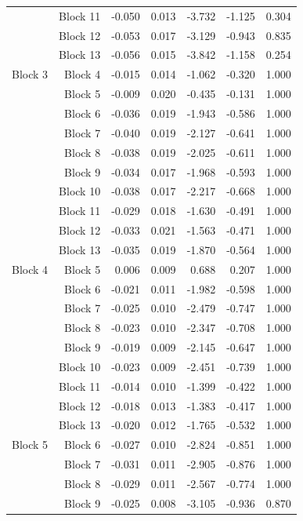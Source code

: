 \begin{longtable}{lrrrrrr}
		 & Block 11 & -0.050 & 0.013 & -3.732 & -1.125 & 0.304  \\
		 & Block 12 & -0.053 & 0.017 & -3.129 & -0.943 & 0.835  \\
		 & Block 13 & -0.056 & 0.015 & -3.842 & -1.158 & 0.254  \\
		Block 3 & Block 4 & -0.015 & 0.014 & -1.062 & -0.320 & 1.000  \\
		  & Block 5 & -0.009 & 0.020 & -0.435 & -0.131 & 1.000  \\
		 & Block 6 & -0.036 & 0.019 & -1.943 & -0.586 & 1.000  \\
		 & Block 7 & -0.040 & 0.019 & -2.127 & -0.641 & 1.000  \\
		 & Block 8 & -0.038 & 0.019 & -2.025 & -0.611 & 1.000  \\
		 & Block 9 & -0.034 & 0.017 & -1.968 & -0.593 & 1.000  \\
		 & Block 10 & -0.038 & 0.017 & -2.217 & -0.668 & 1.000  \\
		 & Block 11 & -0.029 & 0.018 & -1.630 & -0.491 & 1.000  \\
		 & Block 12 & -0.033 & 0.021 & -1.563 & -0.471 & 1.000  \\
		 & Block 13 & -0.035 & 0.019 & -1.870 & -0.564 & 1.000  \\
		Block 4 & Block 5 & 0.006 & 0.009 & 0.688 & 0.207 & 1.000  \\
		  & Block 6 & -0.021 & 0.011 & -1.982 & -0.598 & 1.000  \\
		 & Block 7 & -0.025 & 0.010 & -2.479 & -0.747 & 1.000  \\
		 & Block 8 & -0.023 & 0.010 & -2.347 & -0.708 & 1.000  \\
		 & Block 9 & -0.019 & 0.009 & -2.145 & -0.647 & 1.000  \\
		 & Block 10 & -0.023 & 0.009 & -2.451 & -0.739 & 1.000  \\
		 & Block 11 & -0.014 & 0.010 & -1.399 & -0.422 & 1.000  \\
		 & Block 12 & -0.018 & 0.013 & -1.383 & -0.417 & 1.000  \\
		 & Block 13 & -0.020 & 0.012 & -1.765 & -0.532 & 1.000  \\
		Block 5 & Block 6 & -0.027 & 0.010 & -2.824 & -0.851 & 1.000  \\
		  & Block 7 & -0.031 & 0.011 & -2.905 & -0.876 & 1.000  \\
		 & Block 8 & -0.029 & 0.011 & -2.567 & -0.774 & 1.000  \\
		 & Block 9 & -0.025 & 0.008 & -3.105 & -0.936 & 0.870  \\

\end{longtable}
